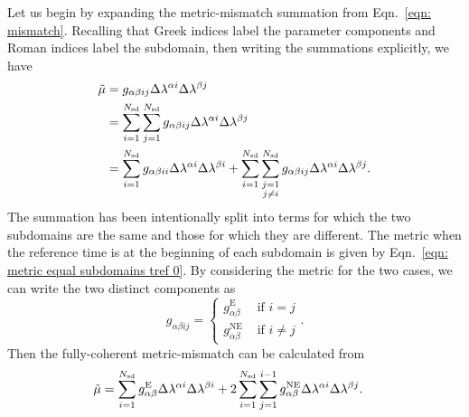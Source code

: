 \documentclass[../full_thesis/full_thesis.tex]{subfiles}
\begin{document}
Let us begin by expanding the metric-mismatch summation from Eqn.~\eqref{eqn:
mismatch}. Recalling that Greek indices label the parameter components and
Roman indices label the subdomain, then writing the summations explicitly, we
have
\begin{align}
\tilde{\mu} & = g_{\alpha\beta i j}\Delta\lambda^{\alpha i}\Delta\lambda^{\beta j}  \\
&=\sum_{i=1}^{N_{\textrm{sd}}}\sum_{j=1}^{N_{\textrm{sd}}}g_{\alpha\beta i j}\Delta\lambda^{\alpha i}\Delta\lambda^{\beta j}  \\
&= \sum_{i=1}^{N_{\textrm{sd}}}g_{\alpha\beta i i}\Delta\lambda^{\alpha i}\Delta\lambda^{\beta i}
+ \sum_{i=1}^{N_{\textrm{sd}}} \sum_{\substack{j=1\\ j \ne i}}^{N_{\textrm{sd}}} g_{\alpha \beta ij}\Delta\lambda^{\alpha i}\Delta\lambda^{\beta j}.
\end{align}
The summation has been intentionally split into terms for which the two
subdomains are the same and those for which they are different. The metric when
the reference time is at the beginning of each subdomain is given by
Eqn.~\eqref{eqn: metric equal subdomains tref 0}. By considering the metric for
the two cases, we can write the two distinct components as
\begin{equation}
g_{\alpha\beta ij} = \left\{
\begin{array}{cc}
g_{\alpha\beta}^{\mathrm{E}} & \textrm{ if } i =j \\
g_{\alpha\beta}^{\mathrm{NE}} & \textrm{ if } i  \ne j
\end{array}\right.  .
\end{equation}
Then the fully-coherent metric-mismatch can be calculated from
\begin{align}
\tilde{\mu} &= \sum_{i=1}^{N_{\textrm{sd}}}g_{\alpha\beta}^{\mathrm{E}}\Delta\lambda^{\alpha i}\Delta\lambda^{\beta i}
+ 2\sum_{i=1}^{N_{\textrm{sd}}} \sum_{j=1}^{i-1} g_{\alpha \beta}^{\mathrm{NE}}\Delta\lambda^{\alpha i}\Delta\lambda^{\beta j} .
\label{eqn: mismatch sep}
\end{align}
\end{document}
